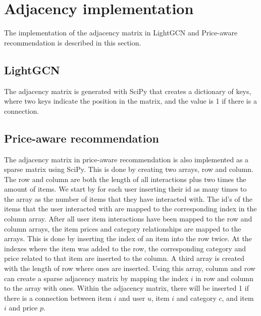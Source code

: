 \section{Adjacency implementation}\label{app:adj-impl}
The implementation of the adjacency matrix in LightGCN and Price-aware recommendation is described in this section.

\subsection{LightGCN}
The adjacency matrix is generated with SciPy that creates a dictionary of keys, where two keys indicate the position in the matrix, and the value is 1 if there is a connection.

\subsection{Price-aware recommendation}
The adjacency matrix in price-aware recommendation is also implemented as a sparse matrix using SciPy.
This is done by creating two arrays, row and column.
The row and column are both the length of all interactions plus two times the amount of items.
We start by for each user inserting their id as many times to the array as the number of items that they have interacted with.
The id's of the items that the user interacted with are mapped to the corresponding index in the column array.
After all user item interactions have been mapped to the row and column arrays, the item prices and category relationships are mapped to the arrays.
This is done by inserting the index of an item into the row twice.
At the indexes where the item was added to the row, the corresponding category and price related to that item are inserted to the column.
A third array is created with the length of row where ones are inserted.
Using this array, column and row can create a sparse adjacency matrix by mapping the index $i$ in row and column to the array with ones.
Within the adjacency matrix, there will be inserted 1 if there is a connection between item $i$ and user $u$, item $i$ and category $c$, and item $i$ and price $p$.